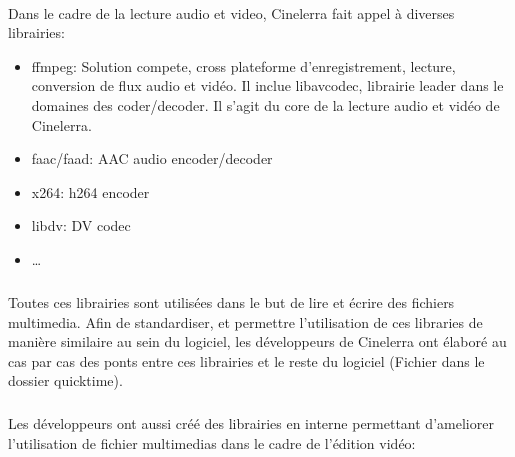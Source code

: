 \paragraph{}

Dans le cadre de la lecture audio et video, Cinelerra fait appel à
diverses librairies:

\begin{itemize}

  \item{ffmpeg: Solution compete, cross plateforme
  d'enregistrement, lecture, conversion de flux audio et vidéo. Il
  inclue libavcodec, librairie leader dans le domaines des
  coder/decoder.
Il s'agit du core de la
  lecture audio et vidéo de Cinelerra.}

  \item{faac/faad: AAC audio encoder/decoder}

  \item{x264: h264 encoder}

  \item{libdv: DV codec}

  \item{\ldots}

\end{itemize}

\subparagraph{}

Toutes ces librairies sont utilisées dans le but de lire et écrire des
fichiers multimedia. Afin de standardiser, et permettre l'utilisation de
ces libraries de manière similaire au sein du logiciel, les développeurs
de Cinelerra ont élaboré au cas par cas des ponts entre ces librairies
et le reste du logiciel (Fichier dans le dossier quicktime).

\subparagraph{}

Les développeurs ont aussi créé des librairies en interne permettant
d'ameliorer l'utilisation de fichier multimedias dans le cadre de
l'édition vidéo:


